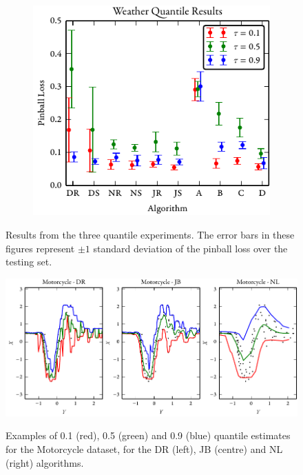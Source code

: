 \documentclass[twoside]{article} \usepackage{aistats2017}
\theoremstyle{definition}
\theoremstyle{theorem}
\begin{document}
\begin{figure}[!htbp]
\begin{subfigure}[b]{0.32\textwidth}
			\end{subfigure}
			\begin{subfigure}[b]{0.32\textwidth}
				\includegraphics[width=\textwidth]{figures/Weather_results}
			\end{subfigure}
			\caption{Results from the three quantile experiments. The error bars in these
				figures represent $\pm 1$ standard deviation of the pinball loss over the testing set.}
			\label{fig:qfull}
		\end{figure}

		\begin{figure}[!htbp]
			\begin{center}
				\includegraphics[width=\columnwidth]{figures/mcquantilesall}\\
			\end{center}
			\caption{Examples of 0.1 (red), 0.5 (green) and 0.9 (blue) quantile estimates
				for the Motorcycle dataset, for the DR (left), JB (centre) and NL (right) algorithms.}
			\label{fig:motorcycleresults} 
		\end{figure}
		
\end{document}
